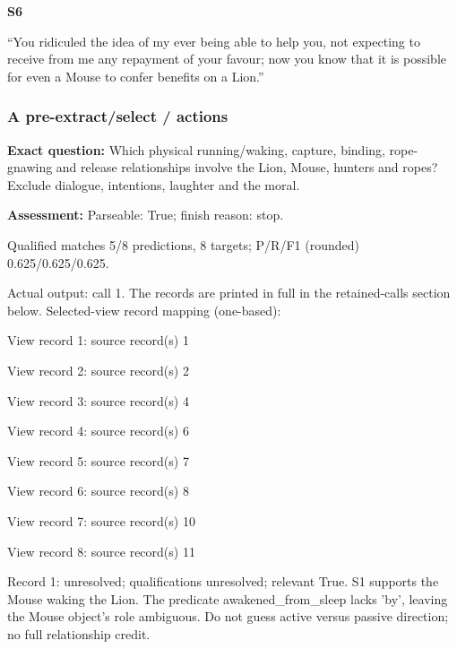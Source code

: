 \noindent\textbf{S6} 

``You ridiculed the idea of my ever being able to help you, not
expecting to receive from me any repayment of your favour; now you know
that it is possible for even a Mouse to confer benefits on a Lion.''
\par\smallskip

\subsubsection*{A pre-extract/select / actions}

\noindent\textbf{Exact question:} Which physical running/waking, capture, binding, rope-gnawing and release relationships involve the Lion, Mouse, hunters and ropes? Exclude dialogue, intentions, laughter and the moral.\par

\noindent\textbf{Assessment:} Parseable: True; finish reason: stop.

Qualified matches 5/8 predictions, 8 targets; P/R/F1 (rounded) 0.625/0.625/0.625.\par

Actual output: call 1. The records are printed in full in the retained-calls section below. Selected-view record mapping (one-based):

View record 1: source record(s) 1\par

View record 2: source record(s) 2\par

View record 3: source record(s) 4\par

View record 4: source record(s) 6\par

View record 5: source record(s) 7\par

View record 6: source record(s) 8\par

View record 7: source record(s) 10\par

View record 8: source record(s) 11\par

\noindent Record 1: unresolved; qualifications unresolved; relevant True. S1 supports the Mouse waking the Lion. The predicate awakened\_from\_sleep lacks 'by', leaving the Mouse object's role ambiguous. Do not guess active versus passive direction; no full relationship credit.\par\smallskip

